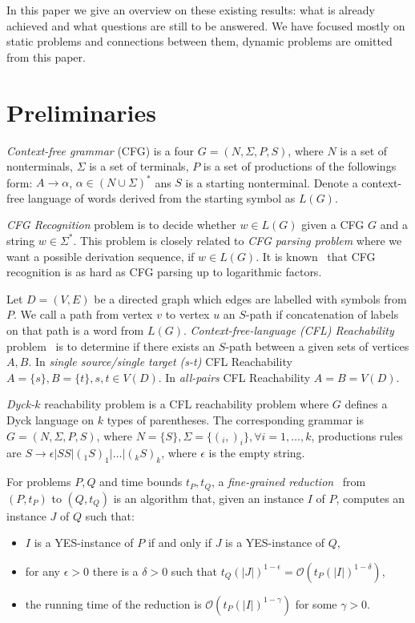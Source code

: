 \documentclass[acmsmall,review,nonacm]{acmart}\settopmatter{printfolios=true,printccs=false,printacmref=false}
\begin{document}
	In this paper we give an overview on these existing results: what is already achieved and what questions are still to be answered. We have focused mostly on static problems and connections between them, dynamic problems are omitted from this paper.
	
	\section{Preliminaries}
	
	\emph{Context-free grammar} (CFG) is a four $G=(N, \Sigma, P, S)$, where $N$ is a set of nonterminals, $\Sigma$ is a set of terminals, $P$ is a set of productions of the followings form: $A \to \alpha$, $\alpha \in (N \cup \Sigma)^*$ ans $S$ is a starting nonterminal. Denote a context-free language of words derived from the starting symbol as $L(G)$.
	
	\emph{CFG Recognition} problem is to decide whether $w \in L(G)$ given a CFG $G$ and a string $w \in \Sigma^*$. This problem is closely related to \emph{CFG parsing problem} where we want a possible derivation sequence, if $w \in L(G)$. It is known~\cite{10.5555/646233.682379} that CFG recognition is as hard as CFG parsing up to logarithmic factors.
		
	Let $D = (V, E)$ be a directed graph which edges are labelled with symbols from $P$. We call a path from vertex $v$ to vertex $u$ an $S$-path if concatenation of labels on that path is a word from $L(G)$.  \emph{Context-free-language (CFL) Reachability} problem~\cite{10.1145/258994.259006} is to determine if there exists an $S$-path between a given sets of vertices $A, B$. In \emph{single source/single target (s-t)} CFL Reachability $A = \{s\}, B = \{t\}, s, t \in V(D)$. In \emph{all-pairs} CFL Reachability $A = B = V(D)$.
	
	\emph{Dyck-$k$} reachability problem is a CFL reachability problem where $G$ defines a Dyck language on $k$ types of parentheses. The corresponding grammar is $G=(N, \Sigma, P, S)$, where $N = \{S\}, \Sigma = \{(_i, )_i\}, \forall i = 1, \ldots, k$, productions rules are $S \rightarrow \epsilon | SS | (_1 S )_1 | \ldots | (_k S )_k$, where $\epsilon$ is the empty string. 
	
	For problems $P, Q$ and time bounds $t_P, t_Q$, a \emph{fine-grained reduction}~\cite{bringmann2019fine} from $(P, t_P)$ to $(Q, t_Q)$ is an algorithm that, given an instance $I$ of $P$, computes an instance $J$ of $Q$ such that: 
	
	\begin{itemize}
		\item $I$ is a YES-instance of $P$ if and only if $J$ is a YES-instance of $Q$,
		\item for any $\epsilon > 0$ there is a $\delta > 0$ such that $t_Q(|J|)^{1 - \epsilon} = \mathcal{O}(t_P (|I|)^{1 - \delta})$, 
		\item the running time of the reduction is $\mathcal{O}(t_P (|I|)^{1 - \gamma})$ for some $\gamma > 0$.
	\end{itemize}
\end{document}
